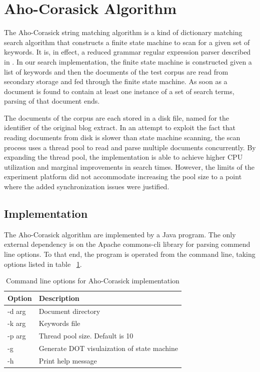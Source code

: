\documentclass[10pt]{report}
\begin{document}
\section{Aho-Corasick Algorithm}
\label{sec:ahocorasickalgorithm}
The Aho-Corasick string matching algorithm\cite{RefWorks:103} is a
kind of dictionary matching search algorithm that constructs a finite
state machine to scan for a given set of keywords. It is, in effect, a
reduced grammar regular expression parser described in
\cite{RefWorks:111}. In our search implementation, the finite state
machine is constructed given a list of keywords and then the documents
of the test corpus are read from secondary storage and fed through the
finite state machine. As soon as a document is found to contain at
least one instance of a set of search terms, parsing of that document
ends.

The documents of the corpus are each stored in a disk file, named for
the identifier of the original blog extract. In an attempt to exploit
the fact that reading documents from disk is slower than state machine
scanning, the scan process uses a thread pool to read and parse
multiple documents concurrently. By expanding the thread pool, the
implementation is able to achieve higher CPU utilization and marginal
improvements in search times. However, the limits of the experiment
platform did not accommodate increasing the pool size to a point where
the added synchronization issues were justified.


\subsection*{Implementation}
The Aho-Corasick algorithm are implemented by a Java
program. The only external dependency is on the Apache commons-cli
library for parsing commend line options. To that end, the program is
operated from the command line, taking options listed in table
~\ref{tab:ahocommandline}.  
\\
\begin{table}[h]
  \centering
  \begin{tabular}{ |l|p{10cm}|} 
    \hline
    Option & Description \\ \hline
    -d \<arg\>  &  Document directory \\ \hline
    -k \<arg\>  &  Keywords file \\ \hline
    -p \<arg\>  &  Thread pool size. Default is 10 \\ \hline
    -g          &  Generate DOT visulaization of state machine \\ \hline
    -h          &  Print help message \\ \hline
  \end{tabular}
  \caption{Command line options for Aho-Corasick implementation}
  \label{tab:ahocommandline}
\end{table}
\\
\end{document}
